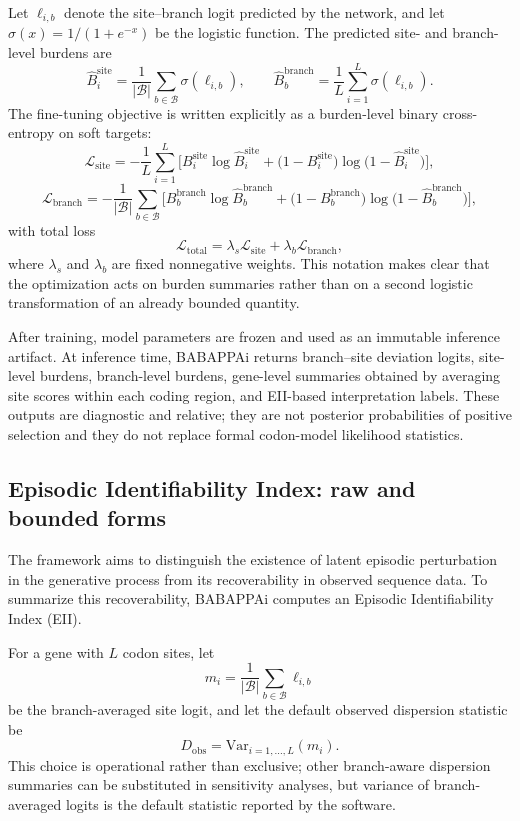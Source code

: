 \documentclass[11pt]{article}
\begin{document}
Let $\ell_{i,b}$ denote the site--branch logit predicted by the network, and let $\sigma(x)=1/(1+e^{-x})$ be the logistic function. The predicted site- and branch-level burdens are
\[
\hat B_i^{\mathrm{site}}=\frac{1}{|\mathcal{B}|}\sum_{b\in\mathcal{B}}\sigma(\ell_{i,b}),
\qquad
\hat B_b^{\mathrm{branch}}=\frac{1}{L}\sum_{i=1}^{L}\sigma(\ell_{i,b}).
\]
The fine-tuning objective is written explicitly as a burden-level binary cross-entropy on soft targets:
\[
\mathcal{L}_{\mathrm{site}}=-\frac{1}{L}\sum_{i=1}^{L}
\Big[
B_i^{\mathrm{site}}\log \hat B_i^{\mathrm{site}}+
\big(1-B_i^{\mathrm{site}}\big)\log\big(1-\hat B_i^{\mathrm{site}}\big)
\Big],
\]
\[
\mathcal{L}_{\mathrm{branch}}=-\frac{1}{|\mathcal{B}|}\sum_{b\in\mathcal{B}}
\Big[
B_b^{\mathrm{branch}}\log \hat B_b^{\mathrm{branch}}+
\big(1-B_b^{\mathrm{branch}}\big)\log\big(1-\hat B_b^{\mathrm{branch}}\big)
\Big],
\]
with total loss
\[
\mathcal{L}_{\mathrm{total}}=\lambda_s\mathcal{L}_{\mathrm{site}}+\lambda_b\mathcal{L}_{\mathrm{branch}},
\]
where $\lambda_s$ and $\lambda_b$ are fixed nonnegative weights. This notation makes clear that the optimization acts on burden summaries rather than on a second logistic transformation of an already bounded quantity.

After training, model parameters are frozen and used as an immutable inference artifact. At inference time, BABAPPAi returns branch--site deviation logits, site-level burdens, branch-level burdens, gene-level summaries obtained by averaging site scores within each coding region, and EII-based interpretation labels. These outputs are diagnostic and relative; they are not posterior probabilities of positive selection and they do not replace formal codon-model likelihood statistics.

\subsection{Episodic Identifiability Index: raw and bounded forms}

The framework aims to distinguish the existence of latent episodic perturbation in the generative process from its recoverability in observed sequence data. To summarize this recoverability, BABAPPAi computes an Episodic Identifiability Index (EII).

For a gene with $L$ codon sites, let
\[
m_i=\frac{1}{|\mathcal{B}|}\sum_{b\in\mathcal{B}} \ell_{i,b}
\]
be the branch-averaged site logit, and let the default observed dispersion statistic be
\[
D_{\mathrm{obs}}=\mathrm{Var}_{i=1,\ldots,L}(m_i).
\]
This choice is operational rather than exclusive; other branch-aware dispersion summaries can be substituted in sensitivity analyses, but variance of branch-averaged logits is the default statistic reported by the software.
\end{document}
